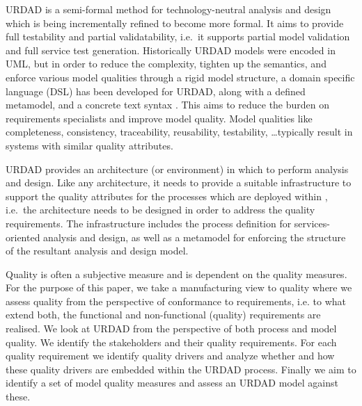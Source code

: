 URDAD is a semi-formal method for technology-neutral analysis and design \cite{solms_urdad_2010} which is being incrementally refined to become more formal. It aims to provide full testability and partial validatability, i.e.\ it supports partial model validation and full service test generation. Historically URDAD models were encoded in UML, but in order to reduce the complexity, tighten up the semantics, and enforce various model qualities through a rigid model structure, a domain specific language (DSL) has been developed for URDAD, along with a defined metamodel, and a concrete text syntax \cite{solmsfritz_domain-specific_????}. This aims to reduce the burden on requirements specialists and improve model quality. Model qualities like completeness, consistency, traceability, reusability, testability, \dots typically result in systems with similar quality attributes\cite{findItIfYouCan}.

URDAD provides an architecture (or environment) in which to perform analysis and design. Like any architecture, it needs to provide a suitable infrastructure to support the quality attributes for the processes which are deployed within \cite{}, i.e.\ the architecture needs to be designed in order to address the quality requirements. The infrastructure includes the process definition for services-oriented analysis and design, as well as a metamodel for enforcing the structure of the resultant analysis and design model.

Quality is often a subjective measure and is dependent on the quality measures. For the purpose of this paper, we take a manufacturing view \cite{garvin_what_1984} to quality where we assess quality from the perspective of conformance to requirements, i.e. to what extend both, the functional and non-functional (quality) requirements are realised. 
We look at URDAD from the perspective of both process and model quality. We identify the stakeholders and their quality requirements. For each quality requirement we identify quality drivers and analyze whether and how these quality drivers are embedded within the URDAD process. Finally we aim to identify a set of model quality measures and assess an URDAD model against these.
